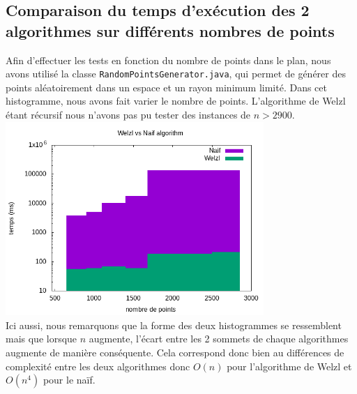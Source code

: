 \documentclass[12pt, a4paper, titlepage]{article}
\begin{document}
    \subsection{Comparaison du temps d'exécution des 2 algorithmes sur différents nombres de points}
    Afin d'effectuer les tests en fonction du nombre de points dans le plan, nous avons utilisé la classe \texttt{RandomPointsGenerator.java}, qui permet de générer des points aléatoirement dans un espace et un rayon minimum limité.
    Dans cet histogramme, nous avons fait varier le nombre de points. L'algorithme de Welzl étant récursif nous n'avons pas pu tester des instances de $n > 2900$.\\
    \includegraphics[width=370px,
                     keepaspectratio,]{welzlNaifPoints.png}\\
                     
    Ici aussi, nous remarquons que la forme des deux histogrammes se ressemblent mais que lorsque $n$ augmente, l'écart entre les 2 sommets de chaque algorithmes augmente de manière conséquente. Cela correspond donc bien au différences de complexité entre les deux algorithmes donc $O(n)$ pour l'algorithme de Welzl et $O(n^{4})$ pour le naïf.\\
\end{document}
